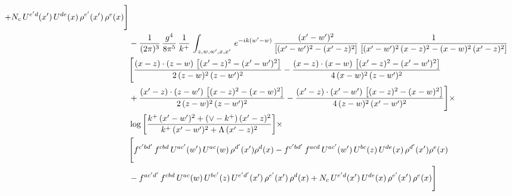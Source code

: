 \documentclass[9pt]{article}
\numberwithin{equation}{section}
\begin{document}
\begin{align}
+N_{c}\,U^{e'd}(x')\,U^{de}(x)\,\rho^{e'}(x')\,\rho^{e}(x)\Bigg]\notag \\ & -\frac{1}{(2\pi)^{3}}\, \frac{g^{4}}{8\pi^{5}}\,\frac{1}{k^{+}}\,\int_{z,w,w^{\prime},x,x'}\, e^{-ik(w^{\prime}-w)}\, \frac{(x'-w')^{2}}{\left[(x'-w')^{2}-(x'-z)^{2}\right]}\, \frac{1}{\left[(x'-w')^{2}\, (x-z)^{2} - (x-w)^{2}\, (x'-z)^{2}\right]}  \notag \\ & \Bigg[\frac{(x-z)\cdot (z-w)\, \left[(x'-z)^{2}-(x'-w')^{2}\right]}{2\, (z-w)^{2}\, (z-w')^{2}}  - \frac{(x-z)\cdot (x-w)\,\left[(x'-z)^{2}-(x'-w')^{2}\right] }{4\,(x-w)^{2}\,(z-w')^{2}}\notag \\ & +\frac{(x'-z)\cdot (z-w')\, \left[(x-z)^{2}-(x-w)^{2}\right]}{2\, (z-w)^{2}\, (z-w')^{2}}-\frac{(x'-z)\cdot (x'-w')\, \left[(x-z)^{2}-(x-w)^{2}\right]}{4\, (z-w)^{2}\,(x'-w')^{2}}\Bigg]\times\,\notag \\ & \log{\left[\frac{k^{+}\, (x'-w')^{2} + (\vee - k^{+})\, (x'-z)^{2}}{k^{+}\, (x'-w')^{2} + \Lambda\, (x'-z)^{2}}\right]}\times\notag \\ & \Bigg[f^{c'bd'}\,f^{cbd}\, U^{ac'}(w')\,U^{ac}(w)\,\rho^{d'}(x')\rho^{d}(x)- f^{c'bd'}\,f^{acd}\,U^{ac'}(w')\,U^{bc}(z)\,U^{de}(x)\,\rho^{d'}(x')\rho^{e}(x) \notag \\ & -f^{ac'd'}\,f^{cbd}\,U^{ac}(w)\,U^{bc'}(z)\,U^{e'd'}(x')\,\rho^{e'}(x')\,\rho^{d}(x) +N_{c}\,U^{e'd}(x')\,U^{de}(x)\,\rho^{e'}(x')\,\rho^{e}(x)\Bigg]
\end{align}
\end{document}
